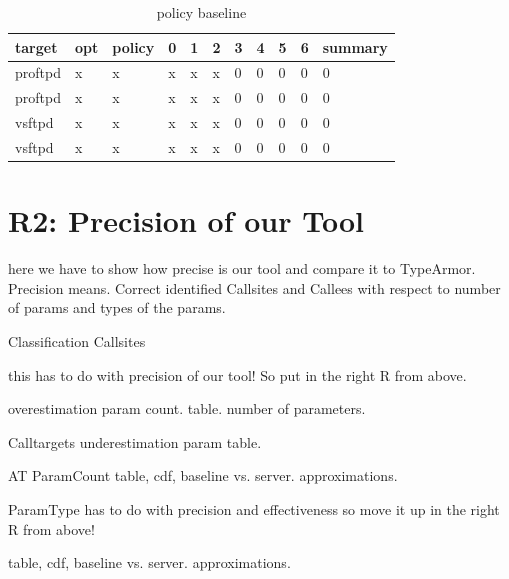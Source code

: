 \begin{table}[H]
\centering
\caption{policy baseline}
\label{matching}
\begin{tabular}{|l|l|l|l|l|l|l|l|l|l|l|} \hline
\textbf{target}  & \textbf{opt}     & \textbf{policy} & \textbf{0}    &\textbf{1} & \textbf{2}  & \textbf{3} &\textbf{4} & \textbf{5} &\textbf{6}  &\textbf{summary} \\ \hline 
proftpd          &x                 &x                &x              &x          &x            &0           &0          &0           &0           &0     \\ \hline
proftpd          &x                 &x                &x              &x          &x            &0           &0          &0           &0           &0      \\ \hline
vsftpd           &x                 &x                &x              &x          &x            &0           &0          &0           &0           &0      \\ \hline
vsftpd           &x                 &x                &x              &x          &x            &0           &0          &0           &0           &0      \\ \hline

\end{tabular}
\end{table}


\section{R2: Precision of our Tool}
\label{R2: Precision of our Tool}
here we have to show how precise is our tool and compare it to TypeArmor.
Precision means. Correct identified Callsites and Callees with respect to number of params and types of the params.

Classification
Callsites

this has to do with precision of our tool! So put in the right R from above.

overestimation param count. table.
number of parameters.

Calltargets
underestimation param table.

AT
ParamCount
table, cdf, baseline vs. server. approximations.

ParamType
has to do with precision and effectiveness so move it up in the right R from above!

table, cdf, baseline vs. server. approximations.


